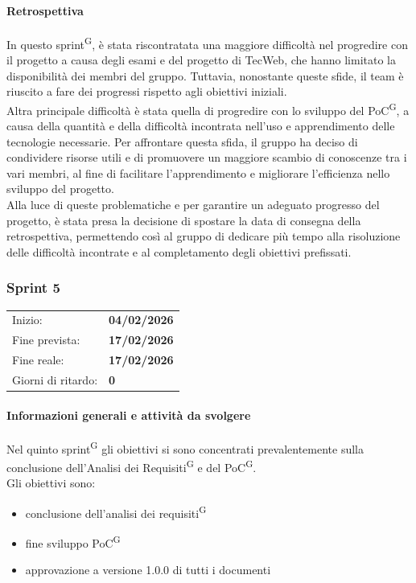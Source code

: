 \documentclass[a4paper, 11pt]{article}
\newcommand{\subsubsubsection}[1]{\paragraph{#1}}
\begin{document}
\subsubsubsection{Retrospettiva}
In questo sprint\textsuperscript{G}, è stata riscontratata una maggiore difficoltà nel progredire con il progetto a causa degli esami e del progetto di TecWeb, che hanno limitato la disponibilità dei membri del gruppo. Tuttavia, nonostante queste sfide, il team è riuscito a fare dei progressi rispetto agli obiettivi iniziali.\\
Altra principale difficoltà è stata quella di progredire con lo sviluppo del PoC\textsuperscript{G}, a causa della quantità e della difficoltà incontrata nell'uso e apprendimento delle tecnologie necessarie. Per affrontare questa sfida, il gruppo ha deciso di condividere risorse utili e di promuovere un maggiore scambio di conoscenze tra i vari membri, al fine di facilitare l'apprendimento e migliorare l'efficienza nello sviluppo del progetto.\\
Alla luce di queste problematiche e per garantire un adeguato progresso del progetto, è stata presa la decisione di spostare la data di consegna della retrospettiva, permettendo così al gruppo di dedicare più tempo alla risoluzione delle difficoltà incontrate e al completamento degli obiettivi prefissati.\\















\newpage










\subsubsection{Sprint 5}
\begin{tabular}{ll}
Inizio: & \textbf{04/02/2026} \\
Fine prevista: & \textbf{17/02/2026} \\
Fine reale: & \textbf{17/02/2026} \\
Giorni di ritardo: & \textbf{0} \\
\end{tabular}


\subsubsubsection{Informazioni generali e attività da svolgere}
Nel quinto sprint\textsuperscript{G} gli obiettivi si sono concentrati prevalentemente sulla conclusione dell'Analisi dei Requisiti\textsuperscript{G} e del PoC\textsuperscript{G}.\\
Gli obiettivi sono:
\begin{itemize}
  \item conclusione dell'analisi dei requisiti\textsuperscript{G}
  \item fine sviluppo PoC\textsuperscript{G}
  \item approvazione a versione 1.0.0 di tutti i documenti
\end{itemize}
\end{document}

